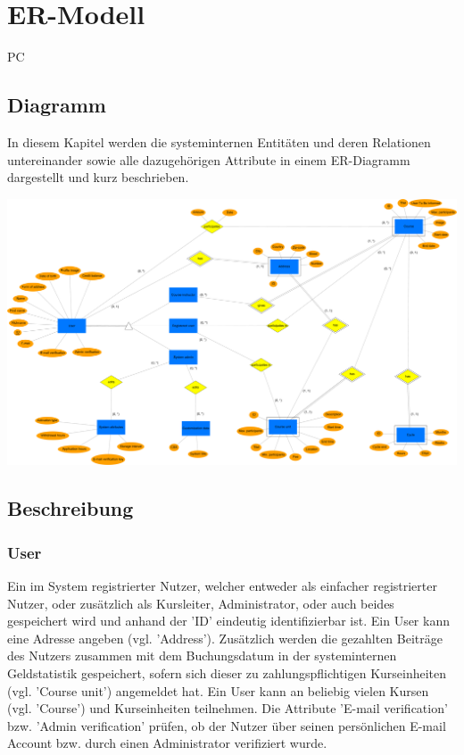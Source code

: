 \chapter{ER-Modell}

\begin{tiny}
PC
\end{tiny}

\section{Diagramm}

In diesem Kapitel werden die systeminternen Entitäten und deren Relationen untereinander sowie alle dazugehörigen Attribute in einem ER-Diagramm dargestellt und kurz beschrieben.

\includegraphics[scale=0.085]{./Grafiken/ER-Diagramm.pdf}

\section{Beschreibung}
\subsection{User}
Ein im System registrierter Nutzer, welcher entweder als einfacher registrierter Nutzer, oder zusätzlich als Kursleiter, Administrator, oder auch beides gespeichert wird und anhand der 'ID' eindeutig identifizierbar ist. Ein User kann eine Adresse angeben (vgl. 'Address'). Zusätzlich werden die gezahlten Beiträge des Nutzers zusammen mit dem Buchungsdatum in der systeminternen Geldstatistik gespeichert, sofern sich dieser zu zahlungspflichtigen Kurseinheiten (vgl. 'Course unit') angemeldet hat. Ein User kann an beliebig vielen Kursen (vgl. 'Course') und Kurseinheiten teilnehmen. Die Attribute 'E-mail verification' bzw. 'Admin verification' prüfen, ob der Nutzer über seinen persönlichen E-mail Account bzw. durch einen Administrator verifiziert wurde.

